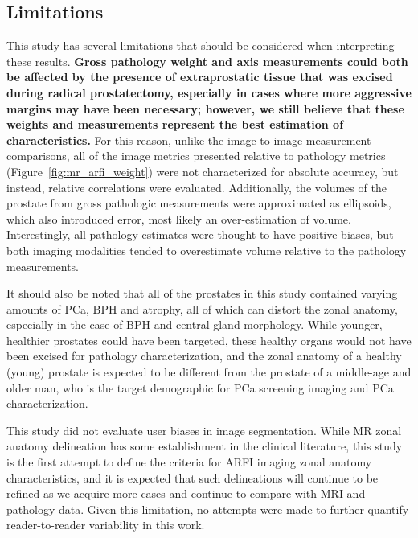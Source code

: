 \subsection{Limitations}
This study has several limitations that should be considered when interpreting
these results.  \textbf{Gross pathology weight and axis measurements could both
be affected by the presence of extraprostatic tissue that was excised during
radical prostatectomy, especially in cases where more aggressive margins may
have been necessary; however, we still believe that these weights and
measurements represent the best estimation of \invivo characteristics.}  For
this reason, unlike the image-to-image measurement comparisons, all of the
image metrics presented relative to pathology metrics
(Figure~\ref{fig:mr_arfi_weight}) were not characterized for absolute accuracy,
but instead, relative correlations were evaluated.  Additionally, the volumes
of the prostate from gross pathologic measurements were approximated as
ellipsoids, which also introduced error, most likely an over-estimation of
volume.  Interestingly, all pathology estimates were thought to have positive
biases, but both imaging modalities tended to overestimate volume relative to
the pathology measurements.

It should also be noted that all of the prostates in this study contained
varying amounts of PCa, BPH and atrophy, all of which can distort the zonal
anatomy, especially in the case of BPH and central gland morphology.  While
younger, healthier prostates could have been targeted, these healthy organs
would not have been excised for pathology characterization, and the zonal
anatomy of a healthy (young) prostate is expected to be different from the
prostate of a middle-age and older man, who is the target demographic for PCa screening
imaging and PCa characterization. 

This study did not evaluate user biases in image segmentation.  While MR zonal
anatomy delineation has some establishment in the clinical literature, this
study is the first attempt to define the criteria for ARFI imaging zonal
anatomy characteristics, and it is expected that such delineations will
continue to be refined as we acquire more cases and continue to compare with
MRI and pathology data.  Given this limitation, no attempts were made to
further quantify reader-to-reader variability in this work.
